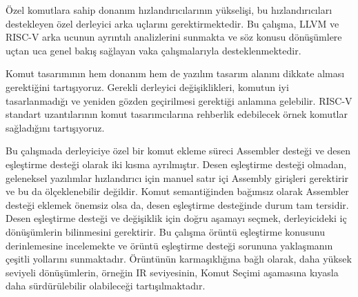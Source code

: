 Özel komutlara sahip donanım hızlandırıcılarının yükselişi, bu hızlandırıcıları destekleyen özel derleyici arka uçlarını gerektirmektedir. Bu çalışma, LLVM ve RISC-V arka ucunun ayrıntılı analizlerini sunmakta ve söz konusu dönüşümlere uçtan uca genel bakış sağlayan vaka çalışmalarıyla desteklenmektedir. 

Komut tasarımının hem donanım hem de yazılım tasarım alanını dikkate alması gerektiğini tartışıyoruz. Gerekli derleyici değişiklikleri, komutun iyi tasarlanmadığı ve yeniden gözden geçirilmesi gerektiği anlamına gelebilir. RISC-V standart uzantılarının komut tasarımcılarına rehberlik edebilecek örnek komutlar sağladığını tartışıyoruz.

Bu çalışmada derleyiciye özel bir komut ekleme süreci Assembler desteği ve desen eşleştirme desteği olarak iki kısma ayrılmıştır. Desen eşleştirme desteği olmadan, geleneksel yazılımlar hızlandırıcı için manuel satır içi Assembly girişleri gerektirir ve bu da ölçeklenebilir değildir. Komut semantiğinden bağımsız olarak Assembler desteği eklemek önemsiz olsa da, desen eşleştirme desteğinde durum tam tersidir. Desen eşleştirme desteği ve değişiklik için doğru aşamayı seçmek, derleyicideki iç dönüşümlerin bilinmesini gerektirir. Bu çalışma örüntü eşleştirme konusunu derinlemesine incelemekte ve örüntü eşleştirme desteği sorununa yaklaşmanın çeşitli yollarını sunmaktadır. Örüntünün karmaşıklığına bağlı olarak, daha yüksek seviyeli dönüşümlerin, örneğin IR seviyesinin, Komut Seçimi aşamasına kıyasla daha sürdürülebilir olabileceği tartışılmaktadır.






